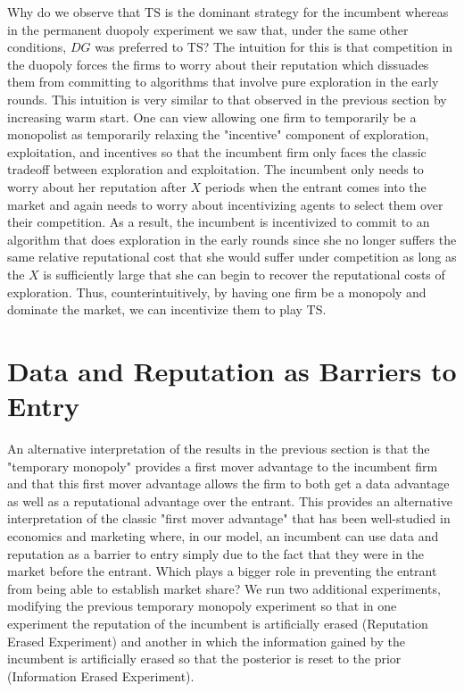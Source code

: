 \documentclass[letterpaper]{article}
\theoremstyle{definition}
\newcommand{\TS}{\mathrm{TS}}
\begin{document}
Why do we observe that $\TS$ is the dominant strategy for the incumbent whereas in the permanent duopoly experiment we saw that, under the same other conditions, $DG$ was preferred to $\TS$? The intuition for this is that competition in the duopoly forces the firms to worry about their reputation which dissuades them from committing to algorithms that involve pure exploration in the early rounds. This intuition is very similar to that observed in the previous section by increasing warm start. One can view allowing one firm to temporarily be a monopolist as temporarily relaxing the "incentive" component of exploration, exploitation, and incentives so that the incumbent firm only faces the classic tradeoff between exploration and exploitation. The incumbent only needs to worry about her reputation after $X$ periods when the entrant comes into the market and again needs to worry about incentivizing agents to select them over their competition. As a result, the incumbent is incentivized to commit to an algorithm that does exploration in the early rounds since she no longer suffers the same relative reputational cost that she would suffer under competition as long as the $X$ is sufficiently large that she can begin to recover the reputational costs of exploration. Thus, counterintuitively, by having one firm be a monopoly and dominate the market, we can incentivize them to play $\TS$.

\section{Data and Reputation as Barriers to Entry}\label{section:6}

An alternative interpretation of the results in the previous section is that the "temporary monopoly" provides a first mover advantage to the incumbent firm and that this first mover advantage allows the firm to both get a data advantage as well as a reputational advantage over the entrant. This provides an alternative interpretation of the classic "first mover advantage" that has been well-studied in economics and marketing \cite*{kerin1992first} where, in our model, an incumbent can use data and reputation as a barrier to entry simply due to the fact that they were in the market before the entrant. Which plays a bigger role in preventing the entrant from being able to establish market share? We run two additional experiments, modifying the previous temporary monopoly experiment so that in one experiment the reputation of the incumbent is artificially erased (Reputation Erased Experiment) and another in which the information gained by the incumbent is artificially erased so that the posterior is reset to the prior (Information Erased Experiment).
\end{document}
